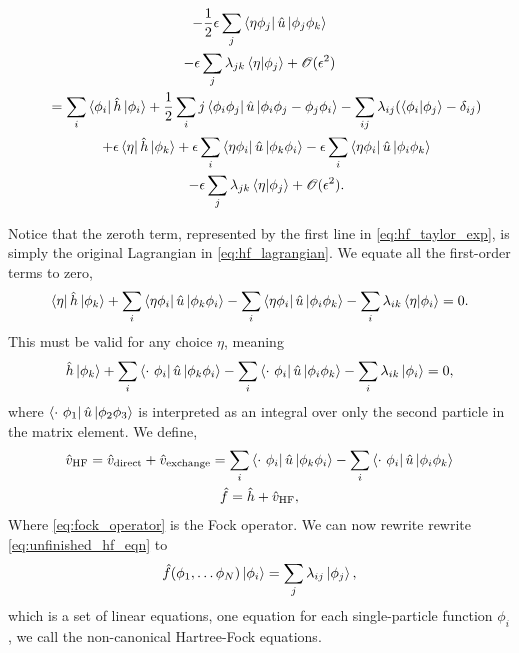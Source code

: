 \begin{gather}
\begin{gathered}
            - \frac{1}{2} \epsilon \sum_j \bra{\eta\phi_j} \hat{u}
                \ket{\phi_j \phi_k} \\
            - \epsilon \sum_j \lambda_{jk}\braket{\eta}{\phi_j}
            + \mathscr{O}(\epsilon^2) 
        \end{gathered} \\
        \quad
        \begin{gathered}
            \label{eq:hf_taylor_exp}
            =
            \sum_i \bra{\phi_i} \hat{h} \ket{\phi_i} 
            + \frac{1}{2} \sum_ij \bra{\phi_i \phi_j} \hat{u} 
                    \ket{\phi_i \phi_j - \phi_j \phi_i}
            - \sum_{ij}\lambda_{ij}(\braket{\phi_i}{\phi_j} - \delta_{ij}) \\
            + \epsilon\bra{\eta} \hat{h} \ket{\phi_k}
            + \epsilon \sum_i \bra{\eta\phi_i} \hat{u} \ket{\phi_k \phi_i}
            - \epsilon \sum_i \bra{\eta\phi_i} \hat{u} \ket{\phi_i \phi_k} \\
            - \epsilon \sum_j \lambda_{jk}\braket{\eta}{\phi_j}
            + \mathscr{O}(\epsilon^2).
        \end{gathered}
    \end{gather}

Notice that the zeroth term, represented by the first line in \autoref{eq:hf_taylor_exp},
is simply the original Lagrangian in \autoref{eq:hf_lagrangian}. We equate all the 
first-order terms to zero,
\begin{equation}
    \bra{\eta} \hat{h} \ket{\phi_k} 
    + \sum_i \bra{\eta \phi_i} \hat{u} \ket{\phi_k\phi_i}
    - \sum_i \bra{\eta \phi_i} \hat{u} \ket{\phi_i\phi_k}
    - \sum_i \lambda_{ik} \braket{\eta}{\phi_i} = 0.
\end{equation}
This must be valid for any choice $\eta$, meaning
\begin{equation}
    \label{eq:unfinished_hf_eqn}
    \hat{h} \ket{\phi_k} 
    + \sum_i \bra{\cdot\ \phi_i} \hat{u} \ket{\phi_k\phi_i}
    - \sum_i \bra{\cdot\ \phi_i} \hat{u} \ket{\phi_i\phi_k}
    - \sum_i \lambda_{ik} \ket{\phi_i} = 0,
\end{equation}
where $\bra{\cdot\ \phi_1} \hat{u} \ket{\phi_2 \phi_3}$ is interpreted
as an integral over only the second particle in the matrix element. We define,
\begin{gather}
    \hat{v}_{\text{HF}} = \hat{v}_{\text{direct}} + \hat{v}_{\text{exchange}}
        =\sum_i \bra{\cdot\ \phi_i} \hat{u} \ket{\phi_k\phi_i}
        -\sum_i \bra{\cdot\ \phi_i} \hat{u} \ket{\phi_i\phi_k} \\
    \label{eq:fock_operator} 
    \hat{f} = \hat{h} + \hat{v}_{\text{HF}},
\end{gather}
Where \autoref{eq:fock_operator} is the Fock operator.
We can now rewrite rewrite \autoref{eq:unfinished_hf_eqn} to 
\begin{equation}
    \label{eq:noncanonical_hf_eqns}
    \hat{f}(\phi_1,\dots\phi_N)\ket{\phi_i} = \sum_j \lambda_{ij}\ket{\phi_j},
\end{equation} 
which is a set of linear equations, one equation for each single-particle function 
$\phi_i$, we call the non-canonical Hartree-Fock equations.


